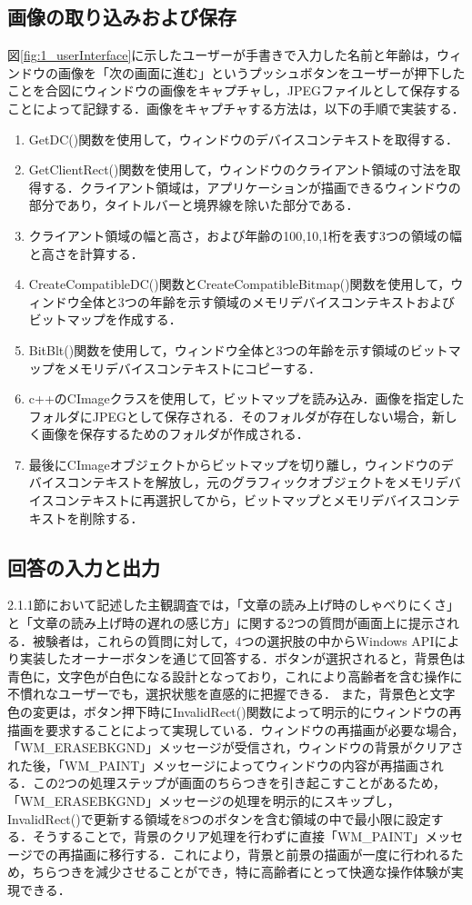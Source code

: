 \subsection{画像の取り込みおよび保存}
図\ref{fig:1_userInterface}に示したユーザーが手書きで入力した名前と年齢は，ウィンドウの画像を「次の画面に進む」というプッシュボタンをユーザーが押下したことを合図にウィンドウの画像をキャプチャし，JPEGファイルとして保存することによって記録する．画像をキャプチャする方法は，以下の手順で実装する．
\begin{enumerate}[leftmargin=*]
  \item GetDC()関数を使用して，ウィンドウのデバイスコンテキストを取得する．
  \item GetClientRect()関数を使用して，ウィンドウのクライアント領域の寸法を取得する．クライアント領域は，アプリケーションが描画できるウィンドウの部分であり，タイトルバーと境界線を除いた部分である．
  \item クライアント領域の幅と高さ，および年齢の100,10,1桁を表す3つの領域の幅と高さを計算する．
  \item CreateCompatibleDC()関数とCreateCompatibleBitmap()関数を使用して，ウィンドウ全体と3つの年齢を示す領域のメモリデバイスコンテキストおよびビットマップを作成する．
  \item BitBlt()関数を使用して，ウィンドウ全体と3つの年齢を示す領域のビットマップをメモリデバイスコンテキストにコピーする．
  \item c++のCImageクラスを使用して，ビットマップを読み込み．画像を指定したフォルダにJPEGとして保存される．そのフォルダが存在しない場合，新しく画像を保存するためのフォルダが作成される．
  \item 最後にCImageオブジェクトからビットマップを切り離し，ウィンドウのデバイスコンテキストを解放し，元のグラフィックオブジェクトをメモリデバイスコンテキストに再選択してから，ビットマップとメモリデバイスコンテキストを削除する．

\end{enumerate}
\subsection{回答の入力と出力}
2.1.1節において記述した主観調査では，「文章の読み上げ時のしゃべりにくさ」と「文章の読み上げ時の遅れの感じ方」に関する2つの質問が画面上に提示される．被験者は，これらの質問に対して，4つの選択肢の中からWindows APIにより実装したオーナーボタンを通じて回答する．ボタンが選択されると，背景色は青色に，文字色が白色になる設計となっており，これにより高齢者を含む操作に不慣れなユーザーでも，選択状態を直感的に把握できる．
また，背景色と文字色の変更は，ボタン押下時にInvalidRect()関数によって明示的にウィンドウの再描画を要求することによって実現している．ウィンドウの再描画が必要な場合，「WM\_ERASEBKGND」メッセージが受信され，ウィンドウの背景がクリアされた後，「WM\_PAINT」メッセージによってウィンドウの内容が再描画される．この2つの処理ステップが画面のちらつきを引き起こすことがあるため，「WM\_ERASEBKGND」メッセージの処理を明示的にスキップし，InvalidRect()で更新する領域を8つのボタンを含む領域の中で最小限に設定する．そうすることで，背景のクリア処理を行わずに直接「WM\_PAINT」メッセージでの再描画に移行する．これにより，背景と前景の描画が一度に行われるため，ちらつきを減少させることができ，特に高齢者にとって快適な操作体験が実現できる．


